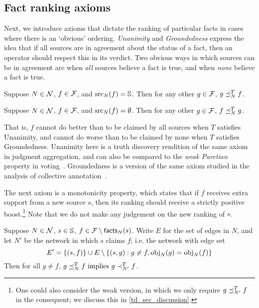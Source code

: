 \subsection{Fact ranking axioms}
\label{td_sec_fact_ranking_axioms}

Next, we introduce axioms that dictate the ranking of particular facts in cases
where there is an `obvious' ordering. \emph{Unanimity} and \emph{Groundedness}
express the idea that if all sources are in agreement about the status of a
fact, then an operator should respect this in its verdict. Two obvious ways in
which sources can be in agreement are when \emph{all} sources believe a fact is
true, and when \emph{none} believe a fact is true.

\begin{axiom}[Unanimity]
Suppose $N \in \N$, $f \in \F$, and $\src_N(f) = \S$. Then for any other $g \in
\F$, $g \fle_N^T f$.
\end{axiom}

\begin{axiom}[Groundedness]
Suppose $N \in \N$, $f \in \F$, and $\src_N(f) = \emptyset$. Then for any other
$g \in \F$, $f \fle_N^T g$.
\end{axiom}

That is, $f$ cannot do better than to be claimed by all sources when $T$
satisfies Unanimity, and cannot do worse than to be claimed by none when $T$
satisfies Groundedness.
%
Unanimity here is a truth discovery rendition of the same axiom in judgment
aggregation, and can also be compared to the \emph{weak Paretian} property in
voting~\cite{brandt2016introduction}. Groundedness is a version of the same
axiom studied in the analysis of collective annotation~\cite{kruger2014}.

The next axiom is a monotonicity property, which states that if $f$
receives extra support from a new source $s$, then its ranking should receive a
strictly positive boost.\footnote{One could also consider the weak version, in
which we only require $g \fle_{N'}^T f$ in the consequent; we discuss this in
\cref{td_sec_discussion}.} Note that we do not make any judgement on the new
ranking of $s$.

\begin{axiom}[Monotonicity]
Suppose $N \in \N$, $s \in \S$, $f \in \F \setminus \facts_N(s)$. Write
$E$ for the set of edges in $N$, and let $N'$ be the network in which $s$
claims $f$; i.e. the network with edge set
\[
    E' = \{(s, f)\} \cup E \setminus \{(s, g) : g \ne f, \obj_N(g) = \obj_N(f) \}
\]
Then for all $g \ne f$,
    $g \fle_N^T f\  \textrm{implies } g \flt_{N'}^T f$.
\end{axiom}

